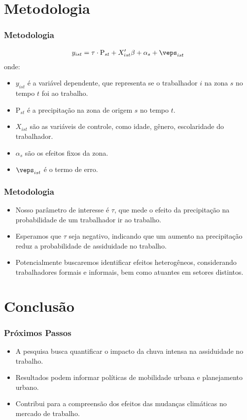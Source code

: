 \section{Metodologia}
\begin{frame}[plain]
    \frametitle{Metodologia}
    \begin{align*}
    y_{ist} &= \tau \cdot \text{P}_{st} + X_{ist}'\beta + \alpha_{s} + \veps_{ist} \\ 
    \end{align*}
    onde:
    \begin{itemize}
        \item $y_{ist}$ é a variável dependente, que representa se o trabalhador $i$ na zona $s$ no tempo $t$ foi ao trabalho.
        \item $\text{P}_{st}$ é a precipitação na zona de origem $s$ no tempo $t$.
        \item $X_{ist}$ são as variáveis de controle, como idade, gênero, escolaridade do trabalhador.
        \item $\alpha_{s}$ são os efeitos fixos da zona.
        \item $\veps_{ist}$ é o termo de erro.
    \end{itemize}
\end{frame}

\begin{frame}
    \frametitle{Metodologia}
    \begin{itemize}
        \item Nosso parâmetro de interesse é $\tau$, que mede o efeito da precipitação na probabilidade de um trabalhador ir ao trabalho.
        \item Esperamos que $\tau$ seja negativo, indicando que um aumento na precipitação reduz a probabilidade de assiduidade no trabalho.
        \item Potencialmente buscaremos identificar efeitos heterogêneos, considerando trabalhadores formais e informais, bem como atuantes em setores distintos.
    \end{itemize}
\end{frame}

\section{Conclusão}
\begin{frame}[plain]
    \frametitle{Próximos Passos}
    \begin{itemize}
        \item A pesquisa busca quantificar o impacto da chuva intensa na assiduidade no trabalho.
        \item Resultados podem informar políticas de mobilidade urbana e planejamento urbano.
        \item Contribui para a compreensão dos efeitos das mudanças climáticas no mercado de trabalho.
    \end{itemize}
\end{frame}